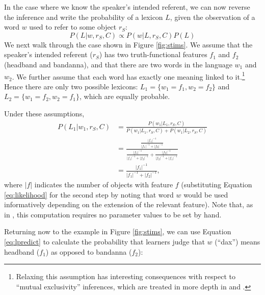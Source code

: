 \documentclass[review]{elsarticle}
\begin{document}
In the case where we know the speaker's intended referent, we can now reverse the inference and write the probability of a lexicon $L$, given the observation of a word $w$ used to refer to some object $r_S$:
\begin{equation}
\label{eq:learner}
P(L | w, r_S, C) \propto P(w | L, r_S, C) P(L)
\end{equation}
We next walk through the case shown in Figure \ref{fig:stims}. We assume that the speaker's intended referent ($r_S$) has two truth-functional features $f_{1}$ and $f_{2}$ ({\sc headband} and {\sc bandanna}), and that there are two words in the language $w_{1}$ and $w_{2}$. We further assume that each word has exactly one meaning linked to it.\footnote{Relaxing this assumption has interesting consequences with respect to ``mutual exclusivity'' inferences, which are treated in more depth in \citet{frank2009} and \citet{lewis2013}.} Hence there are only two possible lexicons: $L_{1}=\{w_{1}{=}f_{1}, w_{2}{=}f_{2}\}$ and $L_{2}=\{w_{1}{=}f_{2}, w_{2}{=}f_{1}\}$, which are equally probable. 

Under these assumptions, 
\begin{equation}
\begin{split}
\label{eq:lpredict}
P(L_{1} | w_{1}, r_S, C) 
&= \frac{P(w_{1} | L_{1}, r_S, C)}{P(w_{1} | L_{1}, r_S, C) + P(w_{1} | L_{2}, r_S, C)} \\
&= \frac{ \frac{ |f_{1}|^{-1}}{|f_{1}|^{-1} + |f_{2}|^{-1}}}
       { \frac{ |f_{1}|^{-1}}{|f_{1}|^{-1} + |f_{2}|^{-1}}  +  \frac{ |f_{2}|^{-1}}{|f_{2}|^{-1} + |f_{1}|^{-1}}} \\
&= \frac{ |f_{1}|^{-1}}
       { |f_{1}|^{-1}  +  |f_{2}|^{-1} }, 
\end{split}
\end{equation}
where $|f|$ indicates the number of objects with feature $f$ (substituting Equation \ref{eq:likelihood} for the second step by noting that word $w$ would be used informatively depending on the extension of the relevant feature). Note that, as in \citet{frank2012}, this computation requires no parameter values to be set by hand.

Returning now to the example in Figure \ref{fig:stims}, we can use Equation \ref{eq:lpredict} to calculate the probability that learners judge that $w$ (``dax'') means {\sc headband} ($f_1$) as opposed to {\sc bandanna} ($f_2$):
\end{document}
